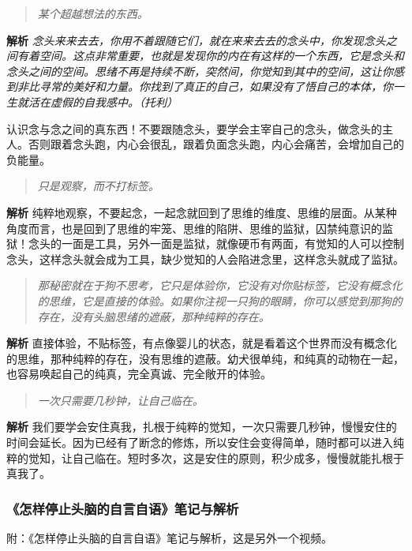 \begin{quote}\it
    某个超越想法的东西。
\end{quote}

\textbf{解析} \textit{念头来来去去，你用不着跟随它们，就在来来去去的念头中，你发现念头之间有着空间。这点非常重要，也就是发现你的内在有这样的一个东西，它是念头和念头之间的空间。思绪不再是持续不断，突然间，你觉知到其中的空间，这让你感到非比寻常的美好和力量。你找到了真正的自己，如果没有了悟自己的本体，你一生就活在虚假的自我感中。（托利）}

认识念与念之间的真东西！不要跟随念头，要学会主宰自己的念头，做念头的主人。否则跟着念头跑，内心会很乱，跟着负面念头跑，内心会痛苦，会增加自己的负能量。

\begin{quote}\it
    只是观察，而不打标签。
\end{quote}

\textbf{解析} 纯粹地观察，不要起念，一起念就回到了思维的维度、思维的层面。从某种角度而言，也是回到了思维的牢笼、思维的陷阱、思维的监狱，囚禁纯意识的监狱！念头的一面是工具，另外一面是监狱，就像硬币有两面，有觉知的人可以控制念头，这样念头就会成为工具，缺少觉知的人会陷进念里，这样念头就成了监狱。

\begin{quote}\it
    那秘密就在于狗不思考，它只是体验你，它没有对你贴标签，它没有概念化的思维，它是直接的体验。如果你注视一只狗的眼睛，你可以感觉到那狗的存在，没有头脑思绪的遮蔽，那种纯粹的存在。
\end{quote}

\textbf{解析} 直接体验，不贴标签，有点像婴儿的状态，就是看着这个世界而没有概念化的思维，那种纯粹的存在，没有思维的遮蔽。幼犬很单纯，和纯真的动物在一起，也容易唤起自己的纯真，完全真诚、完全敞开的体验。

\begin{quote}\it
    一次只需要几秒钟，让自己临在。
\end{quote}

\textbf{解析} 我们要学会安住真我，扎根于纯粹的觉知，一次只需要几秒钟，慢慢安住的时间会延长。因为已经有了断念的修炼，所以安住会变得简单，随时都可以进入纯粹的觉知，让自己临在。短时多次，这是安住的原则，积少成多，慢慢就能扎根于真我了。

\subsubsection{《怎样停止头脑的自言自语》笔记与解析}

附：《怎样停止头脑的自言自语》笔记与解析，这是另外一个视频。

